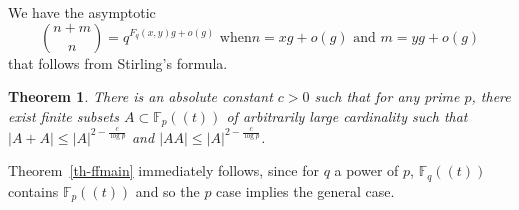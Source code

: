 \documentclass{amsart}
\numberwithin{equation}{section}
\newtheorem{theorem}{Theorem}[section]
\begin{document}
We have the asymptotic
\begin{equation}\label{binomial-asymptotic} \binom{n+m}{n} = q^{ F_q (x,y) g + o(g)} \textrm{ when} n =xg +o(g) \textrm{ and } m=yg + o(g) \end{equation} that follows from Stirling's formula.


\begin{theorem}\label{th-ffspec} There is an absolute constant $c>0$ such that for any prime $p$, there exist finite subsets $A \subset \mathbb F_{p}((t))$ of arbitrarily large cardinality such that $|A + A| \leq |A|^{2 -\frac{c}{\log p}} $ and $|AA| \leq |A|^{2-\frac{c}{\log p}}$.\end{theorem}


Theorem~\ref{th-ffmain} immediately follows, since for $q$ a power of $p$, $\mathbb F_{q}((t))$ contains $\mathbb F_{p}((t))$ and so the $p$ case implies the general case.
\end{document}
